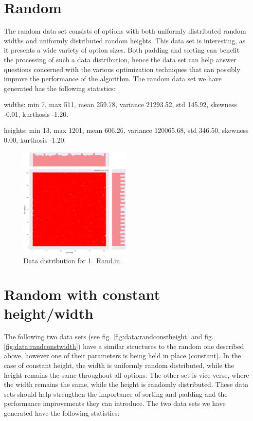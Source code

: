 \section{Random}
The random data set consists of options with both uniformly distributed random widths and uniformly distributed random heights. This data set is interesting, as it presents a wide variety of option sizes. Both padding and sorting can benefit the processing of such a data distribution, hence the data set can help answer questions concerned with the various optimization techniques that can possibly improve the performance of the algorithm. The random data set we have generated has the following statistics:

widths: min 7, max 511, mean 259.78, variance 21293.52, std 145.92, skewness -0.01, kurthosis -1.20.

heights: min 13, max 1201, mean 606.26, variance 120065.68, std 346.50, skewness 0.00, kurthosis -1.20.

\begin{figure}[H]
	\centering
	\includegraphics[width=0.5\textwidth]{img/1_RAND_plot.png}
	\caption{Data distribution for 1\_Rand.in.}
	\label{fig:data:random}
\end{figure}

\section{Random with constant height/width}
The following two data sets (see fig. \ref{fig:data:randconstheight} and fig. \ref{fig:data:randconstwidth}) have a similar structures to the random one described above, however one of their parameters is being held in place (constant). In the case of constant height, the width is uniformly random distributed, while the height remains the same throughout all options. The other set is vice verse, where the width remains the same, while the height is randomly distributed. These data sets should help strengthen the importance of sorting and padding and the performance improvements they can introduce. The two data sets we have generated have the following statistics:


